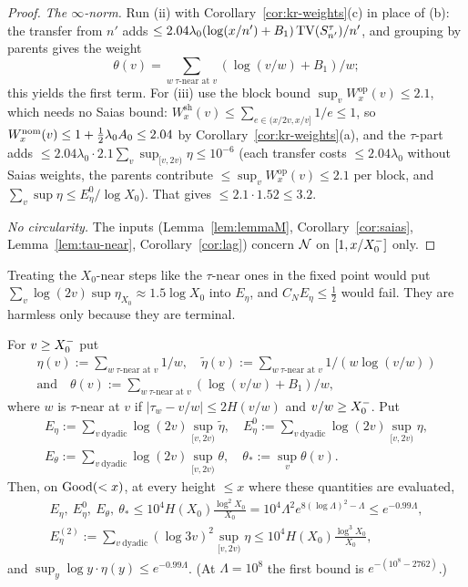 \begin{proof}
\emph{The $\infty$-norm.} Run (ii) with Corollary~\ref{cor:kr-weights}(c) in place of (b): the transfer from $n'$ adds
$\le2.04\lambda_0(\log(x/n')+B_1)\operatorname{TV}(S^\tau_{n'})/n'$, and grouping by parents gives the weight
\[
  \theta(v)=\sum_{w\ \tau\text{-near at }v}(\log(v/w)+B_1)/w;
\]
this yields the first term. For (iii) use the block bound
$\sup_vW^{\mathrm{op}}_x(v)\le2.1$, which needs no Saias bound: $W^{\mathrm{sh}}_x(v)\le\sum_{e\in(x/2v,x/v]}1/e\le1$, so
$W^{\mathrm{nom}}_x(v)\le1+\frac12\lambda_0A_0\le2.04$ by Corollary~\ref{cor:kr-weights}(a), and the $\tau$-part adds
$\le2.04\lambda_0\cdot2.1\sum_v\sup_{[v,2v)}\eta\le10^{-6}$ (each transfer costs $\le2.04\lambda_0$ without Saias weights, the
parents contribute $\le\sup_vW^{\mathrm{op}}_x(v)\le2.1$ per block, and $\sum_v\sup\eta\le E_\eta^0/\log X_0$). That gives $\le2.1\cdot1.52\le3.2$.

\emph{No circularity.} The inputs (Lemma~\ref{lem:lemmaM}, Corollary~\ref{cor:saias}, Lemma~\ref{lem:tau-near},
Corollary~\ref{cor:lag}) concern $\mathcal{N}$ on $[1,x/X_0^{-}]$ only.
\end{proof}

\begin{remark}
Treating the $X_0$-near steps like the $\tau$-near ones in the fixed point would put
$\sum_v\log(2v)\sup\eta_{X_0}\approx1.5\log X_0$ into $E_\eta$, and $C_NE_\eta\le\frac12$ would fail. They are harmless only
because they are terminal.
\end{remark}

\begin{lemma}\label{lem:tau-near}
For $v\ge X_0^{-}$ put
\begin{gather*}
  \eta(v):=\sum_{w\ \tau\text{-near at }v}1/w,\quad\tilde\eta(v):=\sum_{w\ \tau\text{-near at }v}1/(w\log(v/w))\\
  \text{and}\quad\theta(v):=\sum_{w\ \tau\text{-near at }v}(\log(v/w)+B_1)/w,
\end{gather*}
where $w$ is $\tau$-near at $v$ if
$|\tau_w-v/w|\le2H(v/w)$ and $v/w\ge X_0^{-}$. Put
\begin{gather*}
  E_\eta:=\sum_{v\ \text{dyadic}}\log(2v)\sup_{[v,2v)}\tilde\eta,\quad
  E_\eta^0:=\sum_{v\ \text{dyadic}}\log(2v)\sup_{[v,2v)}\eta,\\
  E_\theta:=\sum_{v\ \text{dyadic}}\log(2v)\sup_{[v,2v)}\theta,\quad \theta_*:=\sup_v\theta(v).
\end{gather*}
Then, on $\mathrm{Good}(<x)$, at every height $\le x$ where these quantities are evaluated,
\begin{gather*}
  E_\eta,\ E_\eta^0,\ E_\theta,\ \theta_*\le10^4H(X_0)\frac{\log^2X_0}{X_0}=10^4\Lambda^2e^{8(\log\Lambda)^2-\Lambda}\le e^{-0.99\Lambda},\\
  E_\eta^{(2)}:=\sum_{v\ \text{dyadic}}(\log3v)^2\sup_{[v,2v)}\eta\le10^4H(X_0)\frac{\log^3X_0}{X_0},
\end{gather*}
and $\sup_y\log y\cdot\eta(y)\le e^{-0.99\Lambda}$. (At $\Lambda=10^8$ the first bound is $e^{-(10^8-2762)}$.)
\end{lemma}

